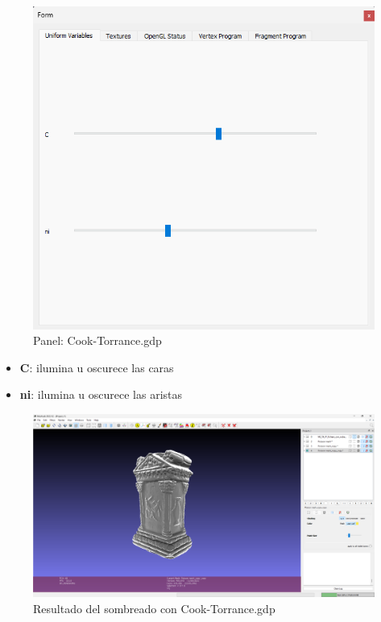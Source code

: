 \documentclass{article}
\begin{document}
\begin{figure}[H]
    \centering
    \includegraphics[scale=0.44]{images/sombras_05.png}
    \caption{Panel: Cook-Torrance.gdp}
\end{figure}

\begin{itemize}
    \item \textbf{C}: ilumina u oscurece las caras
    \item \textbf{ni}: ilumina u oscurece las aristas
\end{itemize}

\begin{figure}[H]
    \centering
    \includegraphics[scale=0.24]{images/sombras_06.png}
    \caption{Resultado del sombreado con Cook-Torrance.gdp}
\end{figure}
\end{document}
